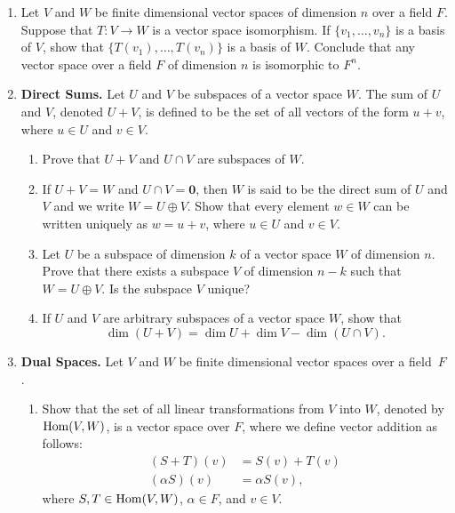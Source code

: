 {\begin{enumerate}
\begin{enumerate}
\end{enumerate}


\item
Let $V$ and $W$ be finite dimensional vector spaces of dimension $n$
over a field $F$. Suppose that  $T: V \rightarrow W$ is a vector space
isomorphism.  If $\{ v_1, \ldots, v_n \}$ is a basis of $V$, show that
$\{ T(v_1), \ldots, T(v_n) \}$ is a basis of $W$. Conclude that any
vector space over a field $F$ of dimension $n$ is isomorphic to $F^n$. 


\item
{\bf Direct Sums.} 
Let $U$ and $V$ be subspaces of a vector space $W$. The sum of $U$ and
$V$, denoted $U + V$, is defined to be the set of all vectors of the
form $u + v$, where $u \in U$ and $v \in V$. 
\begin{enumerate}

   \item
Prove that $U + V$ and $U \cap V$ are subspaces of $W$.

   \item
If $U + V = W$ and $U \cap V = {\mathbf 0}$, then $W$ is said to be the
{\bfi direct sum\/} of $U$ and $V$ and we write $W = U \oplus
V$\label{notedirectsum}.
Show that every element $w \in W$ can be written uniquely as $w = u +
v$, where $u \in U$ and $v \in V$.

   \item
Let $U$ be a subspace of dimension $k$ of a vector space $W$ of
dimension $n$. Prove that there exists a subspace $V$ of dimension
$n-k$ such that $W = U \oplus V$.  Is the subspace $V$ unique?

   \item
If $U$ and $V$ are arbitrary subspaces of a vector space $W$, show
that 
\[
\dim( U + V) = \dim U + \dim V - \dim( U \cap V).
\]

\end{enumerate}


\item
{\bf Dual Spaces.} 
Let $V$ and $W$ be finite dimensional vector spaces over a field~$F$. 
\begin{enumerate}

   \item
Show that the set of all linear transformations from $V$ into $W$,
denoted by $\operatorname{Hom}(V, W)$\label{noteHom}, 
is a vector space over $F$, where we
define vector addition as follows:
\begin{align*}
(S + T)(v) &=  S(v) +T(v) \\
(\alpha S)(v) & =  \alpha S(v),
\end{align*}
where $S, T \in \operatorname{Hom}(V, W)$, $\alpha \in F$, and $v \in V$.
 

\end{enumerate}
\end{enumerate}}
